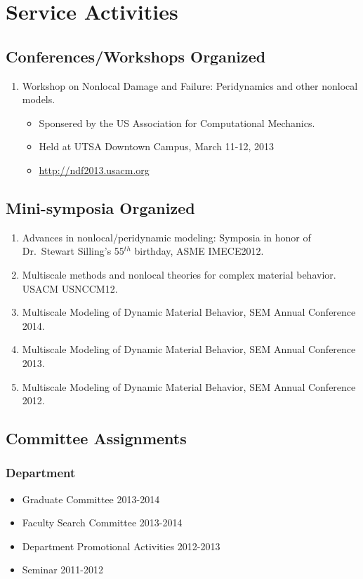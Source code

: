 \section*{Service Activities}

\subsection*{Conferences/Workshops Organized}
  \begin{enumerate}
      \item Workshop on Nonlocal Damage and Failure: Peridynamics and other nonlocal models.  
          \begin{itemize}
             \item Sponsered by the US Association for Computational Mechanics.
             \item Held at UTSA Downtown Campus, March 11-12, 2013
             \item \url{http://ndf2013.usacm.org}
          \end{itemize}
  \end{enumerate}

\subsection*{Mini-symposia Organized}

\begin{enumerate}
    \item Advances in nonlocal/peridynamic modeling: Symposia in honor of Dr.~Stewart Silling's 55$^{th}$ birthday, ASME IMECE2012.
    \item Multiscale methods and nonlocal theories for complex material behavior. USACM USNCCM12.
    \item Multiscale Modeling of Dynamic Material Behavior, SEM Annual Conference 2014.
    \item Multiscale Modeling of Dynamic Material Behavior, SEM Annual Conference 2013.
    \item Multiscale Modeling of Dynamic Material Behavior, SEM Annual Conference 2012.
\end{enumerate}

\subsection*{Committee Assignments}
\subsubsection*{Department}
\begin{itemize}
\item Graduate Committee 2013-2014
\item Faculty Search Committee 2013-2014
\item Department Promotional Activities 2012-2013
\item Seminar 2011-2012
\end{itemize}

